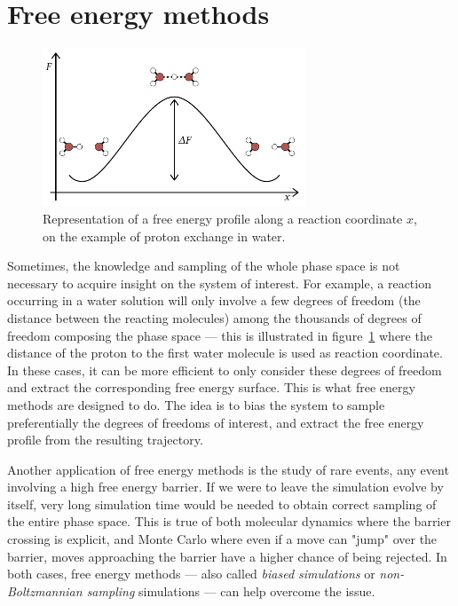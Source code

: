 \documentclass[thesis]{subfiles}
\begin{document}
\newpage
\section{Free energy methods}

\begin{figure}[ht]
    \centering
    \includegraphics[width=0.7\textwidth]{figures/images/free-energy-profile}
    \caption{Representation of a free energy profile along a reaction
    coordinate $x$, on the example of proton exchange in water.}
    \label{fig:free-energy-profile}
\end{figure}

Sometimes, the knowledge and sampling of the whole phase space is not necessary
to acquire insight on the system of interest. For example, a reaction occurring
in a water solution will only involve a few degrees of freedom (the distance
between the reacting molecules) among the thousands of degrees of freedom
composing the phase space --- this is illustrated in
figure~\ref{fig:free-energy-profile} where the distance of the proton to the
first water molecule is used as reaction coordinate. In these cases, it
can be more efficient to only consider these degrees of freedom and extract the
corresponding free energy surface. This is what free energy methods are designed
to do. The idea is to bias the system to sample preferentially the degrees of
freedoms of interest, and extract the free energy profile from the resulting
trajectory.

Another application of free energy methods is the study of rare events, \ie any
event involving a high free energy barrier. If we were to leave the simulation
evolve by itself, very long simulation time would be needed to obtain correct
sampling of the entire phase space. This is true of both molecular dynamics
where the barrier crossing is explicit, and Monte Carlo where even if a move can
"jump" over the barrier, moves approaching the barrier have a higher chance of
being rejected. In both cases, free energy methods --- also called \emph{biased
simulations} or \emph{non-Boltzmannian sampling} simulations --- can help
overcome the issue.
\end{document}
